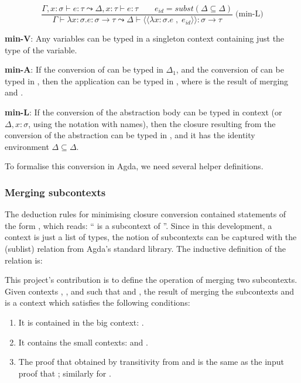 \documentclass[bsc,frontabs,oneside,singlespacing,parskip,deptreport]{infthesis}
\theoremstyle{definition}
\theoremstyle{lemma}
\begin{document}
\[
  \frac {\Gamma , x : \sigma ⊢ e : \tau \leadsto \Delta , x : \tau
    \vdash e : \tau \quad \quad e_{id} = subst ( \Delta \subseteq
    \Delta )}
  {\Gamma \vdash \lambda x : \sigma . e : \sigma \to \tau \leadsto
    \Delta \vdash \langle\langle \lambda x : \sigma . e \; , \; e_{id}
    \rangle\rangle : \sigma \to \tau} \; \text{(min-L)}
\]

\textbf{min-V}: Any variables can be typed in a singleton context
containing just the type of the variable.

\textbf{min-A}: If the conversion  of  can be typed in
$\Delta_1$, and the conversion  of  can be typed in ,
then the application  can be typed in , where 
is the result of merging  and .

\textbf{min-L}: If the conversion  of the abstraction body
 can be typed in context  (or $\Delta, x : \sigma$,
using the notation with names), then the closure resulting from the
conversion of the abstraction can be typed in , and it has the
identity environment $\Delta \subseteq \Delta$.

To formalise this conversion in Agda, we need several helper
definitions.

\subsubsection{Merging subcontexts}
\label{sec:merging-subcontexts}

The deduction rules for minimising closure conversion contained
statements of the form , which reads: `` is a
subcontext of ''. Since in this development, a context is just a
list of types, the notion of subcontexts can be captured with the
 (sublist) relation from Agda's standard library. The
inductive definition of the relation is:


This project's contribution is to define the operation of merging two
subcontexts. Given contexts , , and  such that
 and , the result of merging the subcontexts
 and  is a context  which satisfies the following
conditions:

\begin{enumerate}
\item It is contained in the big context: .
\item It contains the small contexts:  and .
\item The proof that  obtained by transitivity from  and  is the same as the input proof that ; similarly for .
\end{enumerate}
\end{document}

